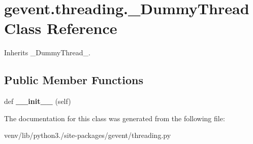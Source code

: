 \hypertarget{classgevent_1_1threading_1_1___dummy_thread}{}\section{gevent.\+threading.\+\_\+\+Dummy\+Thread Class Reference}
\label{classgevent_1_1threading_1_1___dummy_thread}


Inherits \+\_\+\+Dummy\+Thread\+\_\+.

\subsection*{Public Member Functions}
\begin{DoxyCompactItemize}
\item 
\mbox{\label{classgevent_1_1threading_1_1___dummy_thread_a723b0f73748e95516497d608fd372cac}} 
def {\bfseries \+\_\+\+\_\+init\+\_\+\+\_\+} (self)
\end{DoxyCompactItemize}


The documentation for this class was generated from the following file\+:\begin{DoxyCompactItemize}
\item 
venv/lib/python3./site-\/packages/gevent/threading.\+py\end{DoxyCompactItemize}
